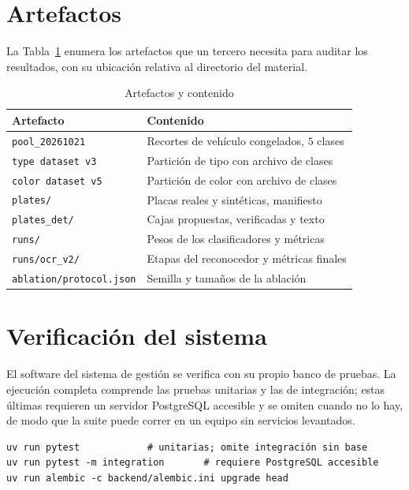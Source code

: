 \section{Artefactos}

La Tabla~\ref{tab:anexo_artefactos} enumera los artefactos que un tercero necesita
para auditar los resultados, con su ubicación relativa al directorio del material.

\begin{table}[H]
    \centering
    \caption{Artefactos y contenido}
    \label{tab:anexo_artefactos}
    \begin{tabular}{ll}
        \toprule
        \textbf{Artefacto} & \textbf{Contenido} \\
        \midrule
        \texttt{pool\_20261021} & Recortes de vehículo congelados, $5$ clases \\
        \texttt{type dataset v3} & Partición de tipo con archivo de clases \\
        \texttt{color dataset v5} & Partición de color con archivo de clases \\
        \texttt{plates/} & Placas reales y sintéticas, manifiesto \\
        \texttt{plates\_det/} & Cajas propuestas, verificadas y texto \\
        \texttt{runs/} & Pesos de los clasificadores y métricas \\
        \texttt{runs/ocr\_v2/} & Etapas del reconocedor y métricas finales \\
        \texttt{ablation/protocol.json} & Semilla y tamaños de la ablación \\
        \bottomrule
    \end{tabular}
\end{table}

\section{Verificación del sistema}

El software del sistema de gestión se verifica con su propio banco de pruebas. La
ejecución completa comprende las pruebas unitarias y las de integración; estas
últimas requieren un servidor PostgreSQL accesible y se omiten cuando no lo hay,
de modo que la suite puede correr en un equipo sin servicios levantados.

\begin{verbatim}
uv run pytest            # unitarias; omite integración sin base
uv run pytest -m integration       # requiere PostgreSQL accesible
uv run alembic -c backend/alembic.ini upgrade head
\end{verbatim}


